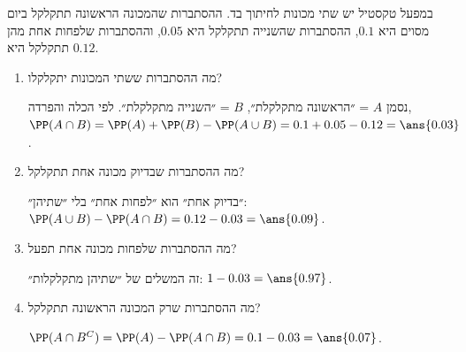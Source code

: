 במפעל טקסטיל יש שתי מכונות לחיתוך בד. ההסתברות שהמכונה הראשונה תתקלקל ביום מסוים היא $0.1$, ההסתברות שהשנייה תתקלקל היא $0.05$, וההסתברות שלפחות אחת מהן תתקלקל היא $0.12$.
\begin{enumerate}
\item מה ההסתברות ששתי המכונות יתקלקלו?
\begin{solbox}
נסמן $A$ = ״הראשונה מתקלקלת״, $B$ = ״השנייה מתקלקלת״. לפי הכלה והפרדה, $\PP(A\cap B)=\PP(A)+\PP(B)-\PP(A\cup B)=0.1+0.05-0.12=\ans{0.03}$.
\end{solbox}
\item מה ההסתברות שבדיוק מכונה אחת תתקלקל?
\begin{solbox}
״בדיוק אחת״ הוא ״לפחות אחת״ בלי ״שתיהן״: $\PP(A\cup B)-\PP(A\cap B)=0.12-0.03=\ans{0.09}$.
\end{solbox}
\item מה ההסתברות שלפחות מכונה אחת תפעל?
\begin{solbox}
זה המשלים של ״שתיהן מתקלקלות״: $1-0.03=\ans{0.97}$.
\end{solbox}
\item מה ההסתברות שרק המכונה הראשונה תתקלקל?
\begin{solbox}
$\PP(A\cap B^C)=\PP(A)-\PP(A\cap B)=0.1-0.03=\ans{0.07}$.
\end{solbox}
\end{enumerate}
